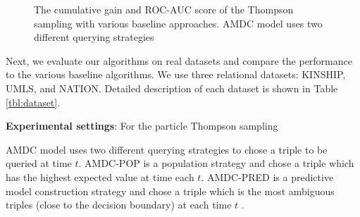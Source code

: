 \begin{figure}[t]
	\centering
	
	\caption{The cumulative gain and ROC-AUC score of the Thompson sampling with various baseline approaches. AMDC model uses two different querying strategies }
\end{figure}

Next, we evaluate our algorithms on real datasets and compare the performance to the various baseline algorithms. We use three relational datasets: KINSHIP, UMLS, and NATION. Detailed description of each dataset is shown in Table \ref{tbl:dataset}.

\textbf{Experimental settings}: For the particle Thompson sampling 

AMDC model uses two different querying strategies to chose a triple to be queried at time $t$. AMDC-POP is a population strategy and chose a triple which has the highest expected value at time each $t$. AMDC-PRED is a predictive model construction strategy and chose a triple which is the most ambiguous triples (close to the decision boundary) at each time $t$ \cite{kajino2015active}.

